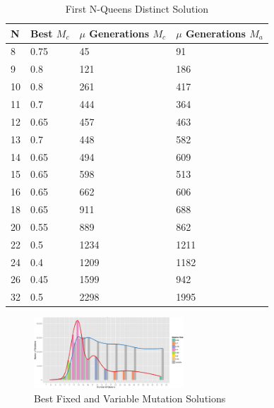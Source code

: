 \documentclass[conference]{IEEEtran}
\begin{document}
\begin{table}
\centering
\caption{First N-Queens Distinct Solution}
\begin{tabular}{|l|l|l|l|} \hline
N&          Best $M_{c}$&  $\mu$ Generations $M_{c}$&  $\mu$ Generations $M_{a}$\\ \hline
 8&         0.75&             45&                 91\\ \hline
 9&          0.8&            121&                186\\ \hline
10&          0.8&            261&                417\\ \hline
11&          0.7&            444&                364\\ \hline
12&         0.65&            457&                463\\ \hline
13&          0.7&            448&                582\\ \hline
14&         0.65&            494&                609\\ \hline
15&         0.65&            598&                513\\ \hline
16&         0.65&            662&                606\\ \hline
18&         0.65&            911&                688\\ \hline
20&         0.55&            889&                862\\ \hline
22&          0.5&           1234&               1211\\ \hline
24&          0.4&           1209&               1182\\ \hline
26&         0.45&           1599&                942\\ \hline
32&          0.5&           2298&               1995\\ \hline
\end{tabular}
\label{table:firstsol}
\end{table}




% 
%
\begin{figure}
\centering
\includegraphics[width=0.50\textwidth]{best_solution_all_queens.png}
\vspace{-18pt}
\caption{Best Fixed and Variable Mutation Solutions}
\label{fig:best_solution_all_queens}
\end{figure}
\end{document}
